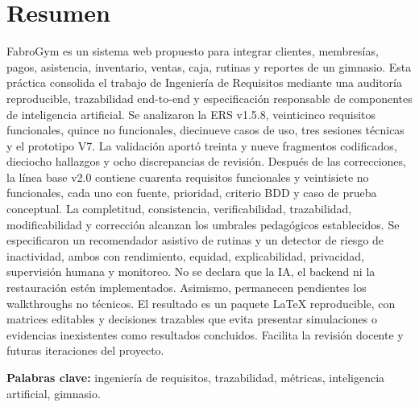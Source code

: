 \documentclass[11pt,a4paper]{article}
\begin{document}
\section*{Resumen}
FabroGym es un sistema web propuesto para integrar clientes, membresías, pagos, asistencia, inventario, ventas, caja, rutinas y reportes de un gimnasio. Esta práctica consolida el trabajo de Ingeniería de Requisitos mediante una auditoría reproducible, trazabilidad end-to-end y especificación responsable de componentes de inteligencia artificial. Se analizaron la ERS v1.5.8, veinticinco requisitos funcionales, quince no funcionales, diecinueve casos de uso, tres sesiones técnicas y el prototipo V7. La validación aportó treinta y nueve fragmentos codificados, dieciocho hallazgos y ocho discrepancias de revisión. Después de las correcciones, la línea base v2.0 contiene cuarenta requisitos funcionales y veintisiete no funcionales, cada uno con fuente, prioridad, criterio BDD y caso de prueba conceptual. La completitud, consistencia, verificabilidad, trazabilidad, modificabilidad y corrección alcanzan los umbrales pedagógicos establecidos. Se especificaron un recomendador asistivo de rutinas y un detector de riesgo de inactividad, ambos con rendimiento, equidad, explicabilidad, privacidad, supervisión humana y monitoreo. No se declara que la IA, el backend ni la restauración estén implementados. Asimismo, permanecen pendientes los walkthroughs no técnicos. El resultado es un paquete LaTeX reproducible, con matrices editables y decisiones trazables que evita presentar simulaciones o evidencias inexistentes como resultados concluidos. Facilita la revisión docente y futuras iteraciones del proyecto.

\textbf{Palabras clave:} ingeniería de requisitos, trazabilidad, métricas, inteligencia artificial, gimnasio.
\end{document}
